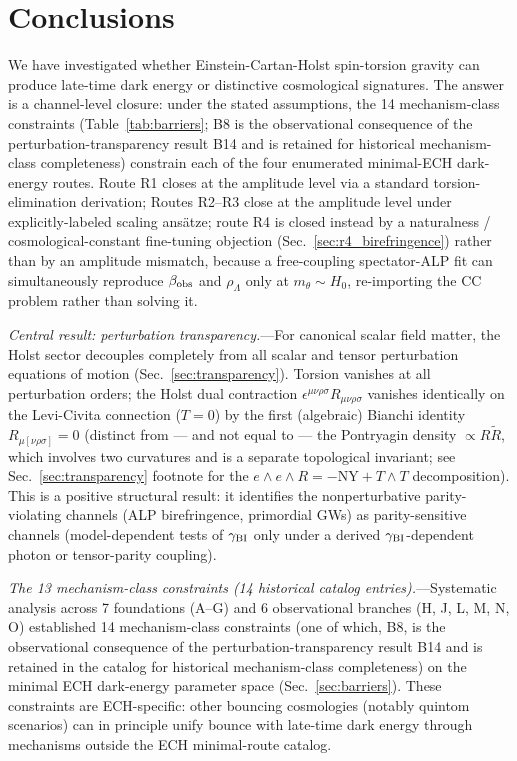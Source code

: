 \documentclass[aps,prd,twocolumn,superscriptaddress,showpacs,preprintnumbers,nofootinbib,longbibliography,floatfix]{revtex4-2}
\begin{document}
\section{Conclusions}\label{sec:conclusions}

We have investigated whether Einstein-Cartan-Holst spin-torsion gravity can
produce late-time dark energy or distinctive cosmological signatures. The answer
is a channel-level closure: under the stated assumptions, the 14
mechanism-class constraints (Table~\ref{tab:barriers}; B8 is the
observational consequence of the perturbation-transparency result B14
and is retained for historical mechanism-class completeness) constrain
each of the four enumerated minimal-ECH dark-energy routes. Route
R1 closes at the amplitude level via a standard torsion-elimination
derivation; Routes R2--R3 close at the amplitude level under
explicitly-labeled scaling ans\"atze; route R4 is closed instead by a
naturalness / cosmological-constant
fine-tuning objection (Sec.~\ref{sec:r4_birefringence}) rather than by an
amplitude mismatch, because a free-coupling spectator-ALP fit can
simultaneously reproduce $\beta_{\rm obs}$ and $\rho_\Lambda$ only at
$m_\theta\!\sim\!H_0$, re-importing the CC problem rather than solving it.

\textit{Central result: perturbation transparency.}---For canonical scalar field
matter, the Holst sector decouples completely from all scalar and tensor
perturbation equations of motion (Sec.~\ref{sec:transparency}). Torsion vanishes
at all perturbation orders; the Holst dual contraction
$\epsilon^{\mu\nu\rho\sigma}R_{\mu\nu\rho\sigma}$ vanishes identically on the
Levi-Civita connection ($T=0$) by the first (algebraic) Bianchi identity
$R_{\mu[\nu\rho\sigma]}=0$ (distinct from --- and not equal to --- the Pontryagin
density $\propto R\widetilde R$, which involves two curvatures and is a
separate topological invariant; see Sec.~\ref{sec:transparency} footnote for
the $e\wedge e\wedge R = -\mathrm{NY} + T\wedge T$ decomposition). This is a positive structural result: it identifies the
nonperturbative parity-violating channels (ALP birefringence, primordial GWs)
as parity-sensitive channels (model-dependent tests of $\gamma_{\rm BI}$
only under a derived $\gamma_{\rm BI}$-dependent photon or tensor-parity
coupling).

\textit{The 13 mechanism-class constraints (14 historical catalog entries).}---Systematic analysis across 7 foundations (A--G) and
6 observational branches (H, J, L, M, N, O) established 14 mechanism-class constraints (one of which, B8, is the observational consequence of the perturbation-transparency result B14 and is retained in the catalog for historical mechanism-class completeness) on the minimal ECH
dark-energy parameter space (Sec.~\ref{sec:barriers}). These constraints are
ECH-specific: other bouncing cosmologies (notably quintom scenarios) can in
principle unify bounce with late-time dark energy through mechanisms outside the
ECH minimal-route catalog.
\end{document}
